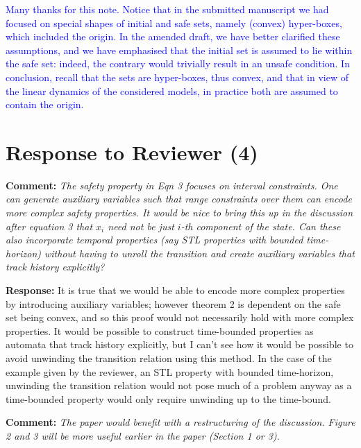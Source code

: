 \documentclass{article}
\newcommand{\rev}[1]{\textcolor{blue}{#1}}
\begin{document}
\rev{
Many thanks for this note. 
Notice that in the submitted manuscript we had focused on special shapes of initial and safe sets, namely (convex) hyper-boxes, which included the
origin. 
In the amended draft, we have better clarified these assumptions, and 
we have emphasised that the initial set is assumed to lie within the safe set: indeed, the contrary would trivially result in an unsafe condition. 
In conclusion, recall that the sets are hyper-boxes, thus convex, and that in view of the linear dynamics of the considered models, in practice both
are assumed to contain the origin.  }

\section{Response to Reviewer (4)}

{\bf Comment:  } {\itshape The safety property in Eqn 3 focuses on interval constraints. One can generate auxiliary variables such that range
constraints over them can encode
more complex safety properties. It would be nice to bring this up in the discussion after equation 3 that $x_i$ need not be just $i$-th component of
the
state.  Can these also incorporate temporal properties (say STL properties with bounded time-horizon) without having to unroll the transition and
create auxiliary variables that track history explicitly?}

\vspace{1em}
{\bf Response:}
 It is true that we would be able to encode more complex properties by introducing auxiliary variables; however theorem 2 is dependent on the safe set being convex, and 
so this proof would not necessarily hold with more complex properties. It would be possible to construct time-bounded properties as automata that track history explicitly, but I can't see how
it would be possible to avoid unwinding the transition relation using this method. In the case of the example given by the reviewer, an STL property with bounded time-horizon, unwinding
the transition relation would not pose much of a problem anyway as a time-bounded property would only require unwinding up to the time-bound.


\vspace{2em}
{\bf Comment: } {\itshape The paper would benefit with a restructuring of the discussion. Figure 2 and 3 will be more useful
earlier in the paper (Section 1 or 3).}
\end{document}
